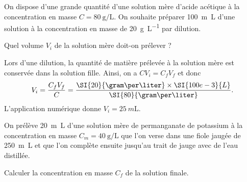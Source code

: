 
\hauteurLargeurCadreReponse		{7mm}{5cm}
\initialisationEntrainement


\debutEntrainement


\begin{enonce}
On dispose d'une grande quantité d'une solution mère d'acide acétique à la concentration en masse $C=\SI{80}{\gram\per\liter}$. On souhaite préparer \SI{100}{m\liter} d'une solution à la concentration en masse de \SI{20}{\gram\per\liter} par dilution. 
\minusMedskip

Quel volume $V_i$ de la solution mère doit-on prélever ? 
\end{enonce}


\begin{corrige}
Lors d'une dilution, la quantité de matière prélevée à la solution mère est conservée dans la solution fille. Ainsi, on a $CV_i=C_fV_f$ et donc \vspace{-1mm}
\[
V_i=\frac{C_fV_f}{C}=\frac{\SI{20}{\gram\per\liter}\times\SI{100e-3}{L}}{\SI{80}{\gram\per\liter}}. \vspace{-1mm}
\]
L'application numérique donne $V_i=\SI{25}{m\liter}$.
\end{corrige}


\bigskip
\begin{enonce}
On prélève \SI{20}{m\liter} d'une solution mère de permanganate de potassium à la concentration en masse $C_m=\SI{40}{\gram\per\liter}$ que l'on verse dans une fiole jaugée de \SI{250}{m\liter} et que l'on complète ensuite jusqu'au trait de jauge avec de l'eau distillée. 
\minusMedskip

Calculer la concentration en masse $C_f$ de la solution finale.
\end{enonce}

